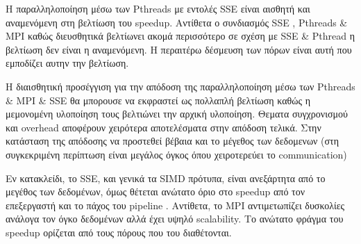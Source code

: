 \documentclass[11pt]{article}
\begin{document}
 Η παραλληλοποίηση μέσω των Pthreads με εντολές SSE είναι αισθητή και αναμενόμενη στη βελτίωση του  speedup. Αντίθετα ο συνδιασμός SSE , Pthreads \& MPI καθώς διευσθητικά βελτίωνει ακομά περισσότερο σε σχέση με SSE \& Pthread   η βελτίωση δεν είναι η αναμενόμενη. Η περαιτέρω δέσμευση των πόρων είναι αυτή που εμποδίζει αυτην την βελτίωση.
 
 Η διαισθητική προσέγγιση για την απόδοση της παραλληλοποίηση μέσω των Pthreads \& MPI \& SSE  θα μπορουσε να εκφραστεί ως πολλαπλή βελτίωση καθώς η μεμονομένη υλοποίηση τους βελτιώνει την αρχική υλοποίηση. Θεματα συγχρονισμού και  overhead  αποφέρουν χειρότερα αποτελέσματα στην απόδοση τελικά. Στην κατάσταση της απόδοσης να προστεθεί βέβαια και το μέγεθος των δεδομενων (στη συγκεκριμένη περίπτωση είναι μεγάλος όγκος όπου χειροτερεύει το  communication)

Εν κατακλείδι, το SSE, και γενικά τα SIMD πρότυπα, είναι ανεξάρτητα από το μεγέθος των δεδομένων, όμως θέτεται ανώτατο όριο στο speedup από τον επεξεργαστή και το πάχος του pipeline . Αντίθετα, το MPI αντιμετωπίζει δυσκολίες ανάλογα τον όγκο δεδομένων αλλά έχει υψηλό scalability. Το ανώτατο φράγμα του speedup  ορίζεται από τους πόρους που του διαθέτονται.
\end{document}
